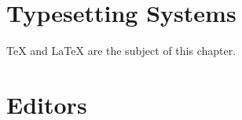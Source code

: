 
\section{Typesetting Systems}
\TeX{} \parencite{knuth1984} and \LaTeX{} \parencite{lamport1994} are the
subject of this chapter. \lipsum[15]

\section{Editors}
\lipsum[16-17]
